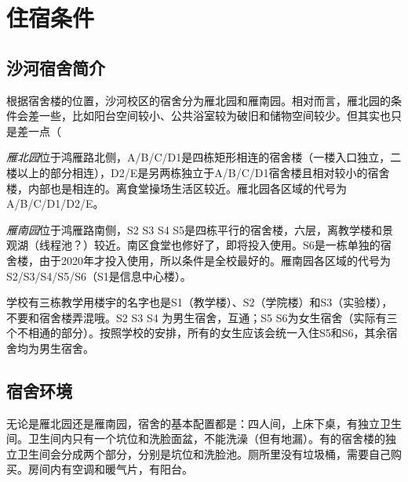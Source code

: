 \section{住宿条件}

\subsection{沙河宿舍简介}

根据宿舍楼的位置，沙河校区的宿舍分为雁北园和雁南园。相对而言，雁北园的条件会差一些，比如阳台空间较小、公共浴室较为破旧和储物空间较少。但其实也只是差一点（

\emph{雁北园}位于鸿雁路北侧，A/B/C/D1是四栋矩形相连的宿舍楼（一楼入口独立，二楼以上的部分相连），D2/E是另两栋独立于A/B/C/D1宿舍楼且相对较小的宿舍楼，内部也是相连的。离食堂操场生活区较近。雁北园各区域的代号为A/B/C/D1/D2/E。

\emph{雁南园}位于鸿雁路南侧，S2 S3 S4 S5是四栋平行的宿舍楼，六层，离教学楼和景观湖（线程池？）较近。南区食堂也修好了，即将投入使用。S6是一栋单独的宿舍楼，由于2020年才投入使用，所以条件是全校最好的。雁南园各区域的代号为S2/S3/S4/S5/S6（S1是信息中心楼）。

学校有三栋教学用楼宇的名字也是S1（教学楼）、S2（学院楼）和S3（实验楼），不要和宿舍楼弄混哦。S2 S3 S4 为男生宿舍，互通；S5 S6为女生宿舍（实际有三个不相通的部分）。按照学校的安排，所有的女生应该会统一入住S5和S6，其余宿舍均为男生宿舍。

\subsection{宿舍环境}

无论是雁北园还是雁南园，宿舍的基本配置都是：四人间，上床下桌，有独立卫生间。卫生间内只有一个坑位和洗脸面盆，不能洗澡（但有地漏）。有的宿舍楼的独立卫生间会分成两个部分，分别是坑位和洗脸池。厕所里没有垃圾桶，需要自己购买。房间内有空调和暖气片，有阳台。

